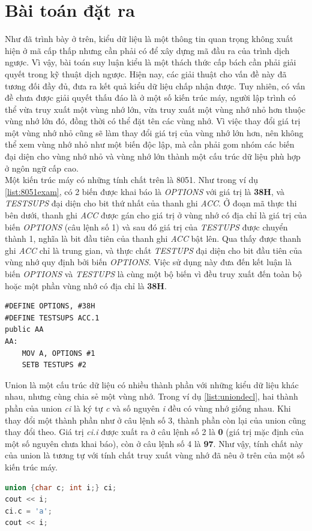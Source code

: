 \section{Bài toán đặt ra}

Như đã trình bày ở trên, kiểu dữ liệu là một thông tin quan trọng không xuất hiện ở mã cấp thấp nhưng cần phải có để xây dựng mã đầu ra của trình dịch ngược. Vì vậy, bài toán suy luận kiểu là một thách thức cấp bách cần phải giải quyết trong kỹ thuật dịch ngược. Hiện nay, các giải thuật cho vấn đề này đã tương đối đầy đủ, đưa ra kết quả kiểu dữ liệu chấp nhận được. Tuy nhiên, có vấn đề chưa được giải quyết thấu đáo là ở một số kiến trúc máy, người lập trình có thể vừa truy xuất một vùng nhớ lớn, vừa truy xuất một vùng nhớ nhỏ hơn thuộc vùng nhớ lớn đó, đồng thời có thể đặt tên các vùng nhớ. Vì việc thay đổi giá trị một vùng nhớ nhỏ cũng sẽ làm thay đổi giá trị của vùng nhớ lớn hơn, nên không thể xem vùng nhớ nhỏ như một biến độc lập, mà cần phải gom nhóm các biến đại diện cho vùng nhớ nhỏ và vùng nhớ lớn thành một cấu trúc dữ liệu phù hợp ở ngôn ngữ cấp cao. \\

Một kiến trúc máy có những tính chất trên là 8051. Như trong ví dụ \ref{list:8051exam}, có 2 biến được khai báo là \textit{OPTIONS} với giá trị là \textbf{38H}, và \textit{TESTSUPS} đại diện cho bit thứ nhất của thanh ghi \textit{ACC}. Ở đoạn mã thực thi bên dưới, thanh ghi \textit{ACC} được gán cho giá trị ở vùng nhớ có địa chỉ là giá trị của biến \textit{OPTIONS} (câu lệnh số 1) và sau đó giá trị của \textit{TESTUPS} được chuyển thành 1, nghĩa là bit đầu tiên của thanh ghi \textit{ACC} bật lên. Qua thấy được thanh ghi \textit{ACC} chỉ là trung gian, và thực chất \textit{TESTUPS} đại diện cho bit đầu tiên của vùng nhớ quy định bởi biến \textit{OPTIONS}. Việc sử dụng này đưa đến kết luận là biến \textit{OPTIONS} và \textit{TESTUPS} là cùng một bộ biến vì đều truy xuất đến toàn bộ hoặc một phần vùng nhớ có địa chỉ là \textbf{38H}.\\

\begin{lstlisting}[caption={Một đoạn mã 8051},label={list:8051exam}]
#DEFINE OPTIONS, #38H
#DEFINE TESTSUPS ACC.1
public AA
AA:
	MOV A, OPTIONS #1
	SETB TESTUPS #2
\end{lstlisting}


Union là một cấu trúc dữ liệu có nhiều thành phần với những kiểu dữ liệu khác nhau, nhưng cùng chia sẻ một vùng nhớ. Trong ví dụ \ref{list:uniondecl}, hai thành phần của union \textit{ci} là ký tự \textit{c} và số nguyên \textit{i} đều có vùng nhớ giống nhau. Khi thay đổi một thành phần như ở câu lệnh số 3, thành phần còn lại của union cũng thay đổi theo. Giá trị \textit{ci.i} được xuất ra ở câu lệnh số 2 là \textbf{0} (giá trị mặc định của một số nguyên chưa khai báo), còn ở câu lệnh số 4 là \textbf{97}. Như vậy, tính chất này của union là tương tự với tính chất truy xuất vùng nhớ đã nêu ở trên của một số kiến trúc máy.\\
\begin{lstlisting}[caption={Một đoạn khai báo union},label={list:uniondecl},language=c++]
union {char c; int i;} ci;
cout << i;
ci.c = 'a';
cout << i;
\end{lstlisting}

